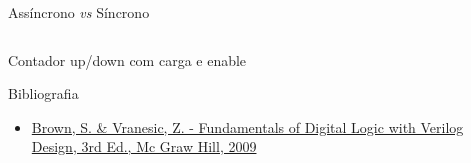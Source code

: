 \begin{frame}{Assíncrono \textit{vs} Síncrono}   \centering
	\begin{columns}
    \end{columns}
\end{frame}

\begin{frame}{Contador up/down com carga e enable} \centering
\end{frame}

\begin{frame}{Bibliografia} 
	\begin{itemize}
		\item \href{https://www.google.com.br/search?q=filetype\%3Apdf+Fundamentals+of+Digital+Logic+with+Verilog+Design+&oq=filetype\%3Apdf}{Brown, S. \& Vranesic, Z. - Fundamentals of Digital Logic with Verilog Design, 3rd Ed., Mc Graw Hill, 2009}
	\end{itemize}
\end{frame}

\begin{frame}
	\titlepage
\end{frame} 

